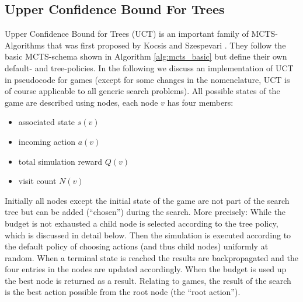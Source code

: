 \subsection{Upper Confidence Bound For Trees}
\label{ss:uct}
Upper Confidence Bound for Trees (UCT) is an important family of MCTS-Algorithms that was first proposed by Kocsis and Szespevari \cite{kocsis2006bandit}. They follow the basic MCTS-schema shown in Algorithm \ref{alg:mcts_basic} but define their own default- and tree-policies. In the following we discuss an implementation of UCT in pseudocode for games (except for some changes in the nomenclature, UCT is of course applicable to all generic search problems). All possible states of the game are described using nodes, each node $v$ has four members:
\begin{itemize}
    \item associated state $s(v)$
    \item incoming action $a(v)$
    \item total simulation reward $Q(v)$
    \item visit count $N(v)$
\end{itemize} Initially all nodes except the initial state of the game are not part of the search tree but can be added (\enquote{chosen}) during the search. More precisely: While the budget is not exhausted a child node is selected according to the tree policy, which is discussed in detail below. Then the simulation is executed according to the default policy of choosing actions (and thus child nodes) uniformly at random. When a terminal state is reached the results are backpropagated and the four entries in the nodes are updated accordingly. When the budget is used up the best node is returned as a result. Relating to games, the result of the search is the best action possible from the root node (the \enquote{root action}).

